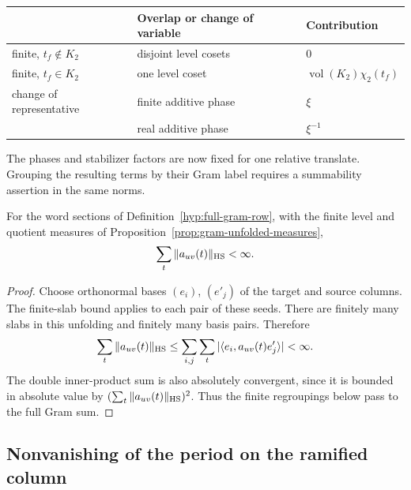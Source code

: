 \begin{construction}
\begin{tabular}{@{}lll@{}}
\toprule
 & Overlap or change of variable & Contribution \\
\midrule
finite, \(t_f\notin K_2\) & disjoint level cosets & \(0\) \\
finite, \(t_f\in K_2\) & one level coset & \(\operatorname{vol}(K_2)\chi_2(t_f)\) \\
change of representative & finite additive phase & \(\xi\) \\
                          & real additive phase   & \(\xi^{-1}\) \\
\bottomrule
\end{tabular}
\caption{The factors in Proposition~\ref{prop:gram-unfolded-measures}. The first level function is conjugated in the pairing. The changes of additive phase cancel for a rational change of representative.}\label{fig:gram-local-phases}
\end{construction}



The phases and stabilizer factors are now fixed for one relative translate. Grouping the resulting terms by their Gram label requires a summability assertion in the same norms.

\begin{lemma}\label{lem:gram-term-sum}
For the word sections of Definition~\ref{hyp:full-gram-row}, with the
finite level and quotient measures of Proposition~\ref{prop:gram-unfolded-measures}, 
\[
 \sum_t\|a_{uv}(t)\|_{\rm HS}<\infty.
\]

\end{lemma}
\begin{proof}
Choose orthonormal bases \((e_i)\), \((e'_j)\) of the target
and source columns. The finite-slab bound applies to each
pair of these seeds. There are finitely many slabs in this
unfolding and finitely many basis pairs. Therefore
\[
 \sum_t\|a_{uv}(t)\|_{\rm HS}\le
        \sum_{i,j}\sum_t |\langle e_i,a_{uv}(t)e'_j\rangle|
        <\infty .
\]
The double inner-product sum is also absolutely convergent,
since it is bounded in absolute value by
\((\sum_t\|a_{uv}(t)\|_{\rm HS})^2\).
Thus the finite regroupings below pass to the full Gram sum.
\end{proof}

\subsection{Nonvanishing of the period on the ramified column}
\label{subsec:pretransport-nonvanishing}

